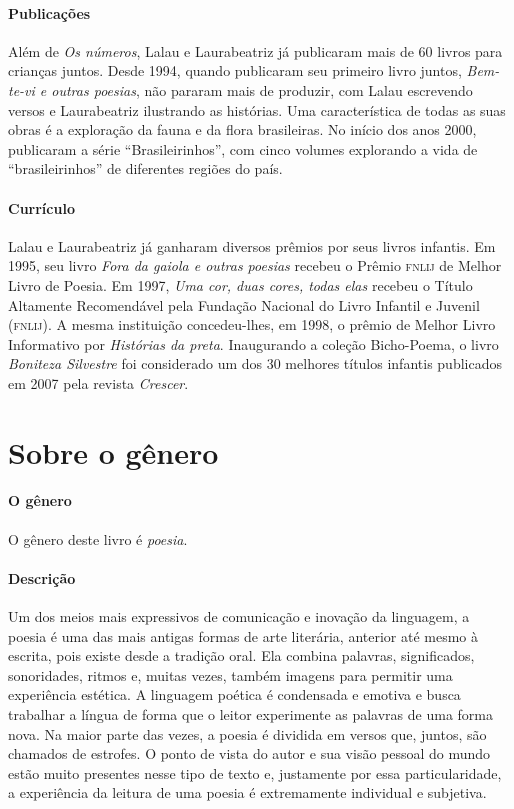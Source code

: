 \documentclass[11pt]{extarticle}
\begin{document}
\paragraph{Publicações} Além de \textit{Os números}, Lalau e Laurabeatriz já publicaram mais de 60 livros para crianças juntos. Desde 1994, quando publicaram seu primeiro livro juntos, \textit{Bem-te-vi e outras poesias}, não pararam mais de produzir, com Lalau escrevendo versos e Laurabeatriz ilustrando as histórias. Uma característica de todas as suas obras é a exploração da fauna e da flora brasileiras. No início dos anos 2000, publicaram a série ``Brasileirinhos'', com cinco volumes explorando a vida de ``brasileirinhos'' de diferentes regiões do país. 

\paragraph{Currículo} Lalau e Laurabeatriz já ganharam diversos prêmios por seus livros infantis. Em 1995, seu livro \textit{Fora da gaiola e outras poesias} recebeu o Prêmio \textsc{fnlij} de Melhor Livro de Poesia. Em 1997, \textit{Uma cor, duas cores, todas elas} recebeu o Título Altamente Recomendável pela Fundação Nacional do Livro Infantil e Juvenil (\textsc{fnlij}). A mesma instituição concedeu-lhes, em 1998, o prêmio de Melhor Livro Informativo por \textit{Histórias da preta}. Inaugurando a coleção Bicho-Poema, o livro \textit{Boniteza Silvestre} foi considerado um dos 30 melhores títulos infantis publicados em 2007 pela revista \textit{Crescer}. 
 


\section{Sobre o gênero}

\paragraph{O gênero} O gênero deste livro é \textit{poesia}. 


\paragraph{Descrição} Um dos meios mais expressivos de comunicação e inovação da linguagem, a poesia é uma das mais antigas formas de arte literária, anterior até mesmo à escrita, pois existe desde a tradição oral. Ela combina palavras, significados, sonoridades, ritmos e, muitas vezes, também imagens para permitir uma experiência estética. A linguagem poética é condensada e emotiva e busca trabalhar a língua de forma que o leitor experimente as palavras de uma forma nova. Na maior parte das vezes, a poesia é dividida em versos que, juntos, são chamados de estrofes. O ponto de vista do autor e sua visão pessoal do mundo estão muito presentes nesse tipo de texto e, justamente por essa particularidade, a experiência da leitura de uma poesia é extremamente individual e subjetiva.
\end{document}
